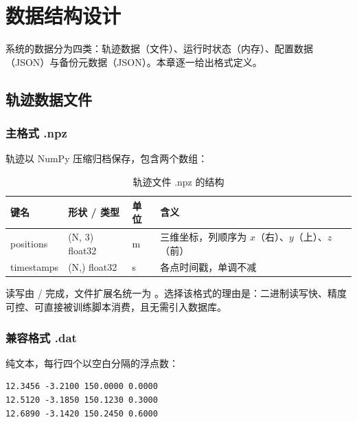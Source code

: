 \section{数据结构设计}

系统的数据分为四类：轨迹数据（文件）、运行时状态（内存）、配置数据（JSON）与备份元数据（JSON）。本章逐一给出格式定义。

\subsection{轨迹数据文件}

\subsubsection{主格式 .npz}

轨迹以 NumPy 压缩归档保存，包含两个数组：

\begin{table}[H]
\centering
\caption{轨迹文件 .npz 的结构}
\label{tab:npz}
\small
\begin{tabularx}{\linewidth}{@{}>{\ttfamily}p{2.2cm}>{\ttfamily}p{2.4cm}>{\ttfamily}p{2.0cm}>{\raggedright\arraybackslash}X@{}}
\toprule
键名 & 形状 / 类型 & 单位 & 含义 \\
\midrule
positions & (N, 3) float32 & m & 三维坐标，列顺序为 $x$（右）、$y$（上）、$z$（前） \\
timestamps & (N,) float32 & s & 各点时间戳，单调不减 \\
\bottomrule
\end{tabularx}
\end{table}

读写由  /  完成，文件扩展名统一为 。选择该格式的理由是：二进制读写快、精度可控、可直接被训练脚本消费，且无需引入数据库。

\subsubsection{兼容格式 .dat}

纯文本，每行四个以空白分隔的浮点数：

\begin{lstlisting}[style=sh, caption={轨迹文本格式示例（data/fact/visible.dat）}]
12.3456 -3.2100 150.0000 0.0000
12.5120 -3.1850 150.1230 0.3000
12.6890 -3.1420 150.2450 0.6000
\end{lstlisting}

